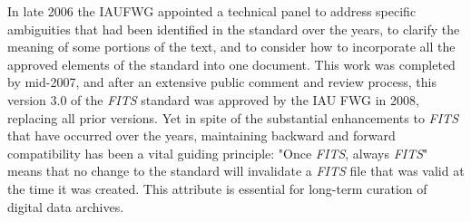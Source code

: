 \documentclass[onecolumn]{aa}
\begin{document}
In late 2006 the IAUFWG appointed a technical panel to address specific
ambiguities that had been identified in the standard over the years, to
clarify the meaning of some portions of the text, and to consider how to
incorporate all the approved elements of the standard into one document.  This
work was completed by mid-2007, and after an extensive public comment and
review process, this version 3.0 of the {\em FITS} standard was approved by the IAU
FWG in 2008, replacing all prior versions.  Yet in spite of the substantial
enhancements to {\em FITS} that have occurred over  the years, maintaining backward
and forward compatibility has been a  vital guiding principle: "Once {\em FITS},
always {\em FITS}" means that no change to the standard will invalidate a {\em FITS} file
that was valid at the time it was created. This attribute is essential for
long-term curation of digital data archives.  

\fi
\end{document}
